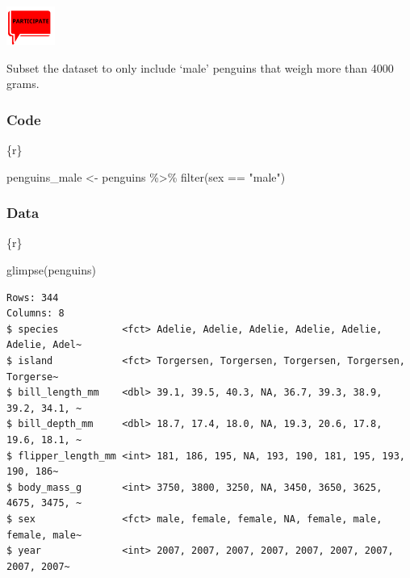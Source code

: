 \documentclass[
  letterpaper,
  DIV=11,
  numbers=noendperiod]{scrreprt}
\newenvironment{Shaded}{\begin{snugshade}}{\end{snugshade}}
\newcommand{\FunctionTok}[1]{\textcolor[rgb]{0.28,0.35,0.67}{#1}}
\newcommand{\InformationTok}[1]{\textcolor[rgb]{0.37,0.37,0.37}{#1}}
\newcommand{\NormalTok}[1]{\textcolor[rgb]{0.00,0.23,0.31}{#1}}
\newcommand{\OtherTok}[1]{\textcolor[rgb]{0.00,0.23,0.31}{#1}}
\newcommand{\SpecialCharTok}[1]{\textcolor[rgb]{0.37,0.37,0.37}{#1}}
\newcommand{\StringTok}[1]{\textcolor[rgb]{0.13,0.47,0.30}{#1}}
\begin{document}
\includegraphics[width=\textwidth,height=0.5in]{images/images_lecture/participate_icon.png}

\begin{tcolorbox}[enhanced jigsaw, colframe=quarto-callout-note-color-frame, breakable, colback=white, toprule=.15mm, leftrule=.75mm, left=2mm, opacityback=0, rightrule=.15mm, arc=.35mm, bottomrule=.15mm]

Subset the dataset to only include `male' penguins that weigh more than
4000 grams.

\hypertarget{code-4}{%
\subsubsection*{Code}\label{code-4}}

\begin{Shaded}
\begin{Highlighting}[]
\InformationTok{\textasciigrave{}\textasciigrave{}\textasciigrave{}\{r\}}

\NormalTok{penguins\_male }\OtherTok{\textless{}{-}}\NormalTok{ penguins }\SpecialCharTok{\%\textgreater{}\%} 
  \FunctionTok{filter}\NormalTok{(sex }\SpecialCharTok{==} \StringTok{"male"}\NormalTok{)}
\InformationTok{\textasciigrave{}\textasciigrave{}\textasciigrave{}}
\end{Highlighting}
\end{Shaded}

\hypertarget{data-4}{%
\subsubsection*{Data}\label{data-4}}

\begin{Shaded}
\begin{Highlighting}[]
\InformationTok{\textasciigrave{}\textasciigrave{}\textasciigrave{}\{r\}}

\FunctionTok{glimpse}\NormalTok{(penguins)}
\InformationTok{\textasciigrave{}\textasciigrave{}\textasciigrave{}}
\end{Highlighting}
\end{Shaded}

\begin{verbatim}
Rows: 344
Columns: 8
$ species           <fct> Adelie, Adelie, Adelie, Adelie, Adelie, Adelie, Adel~
$ island            <fct> Torgersen, Torgersen, Torgersen, Torgersen, Torgerse~
$ bill_length_mm    <dbl> 39.1, 39.5, 40.3, NA, 36.7, 39.3, 38.9, 39.2, 34.1, ~
$ bill_depth_mm     <dbl> 18.7, 17.4, 18.0, NA, 19.3, 20.6, 17.8, 19.6, 18.1, ~
$ flipper_length_mm <int> 181, 186, 195, NA, 193, 190, 181, 195, 193, 190, 186~
$ body_mass_g       <int> 3750, 3800, 3250, NA, 3450, 3650, 3625, 4675, 3475, ~
$ sex               <fct> male, female, female, NA, female, male, female, male~
$ year              <int> 2007, 2007, 2007, 2007, 2007, 2007, 2007, 2007, 2007~
\end{verbatim}


\end{tcolorbox}
\end{document}
